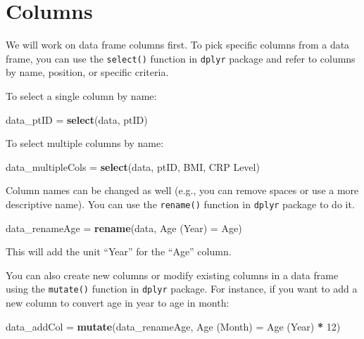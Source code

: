 \documentclass[
]{article}
\newenvironment{Shaded}{\begin{snugshade}}{\end{snugshade}}
\newcommand{\AttributeTok}[1]{\textcolor[rgb]{0.13,0.29,0.53}{#1}}
\newcommand{\DecValTok}[1]{\textcolor[rgb]{0.00,0.00,0.81}{#1}}
\newcommand{\FunctionTok}[1]{\textcolor[rgb]{0.13,0.29,0.53}{\textbf{#1}}}
\newcommand{\NormalTok}[1]{#1}
\newcommand{\OtherTok}[1]{\textcolor[rgb]{0.56,0.35,0.01}{#1}}
\newcommand{\SpecialCharTok}[1]{\textcolor[rgb]{0.81,0.36,0.00}{\textbf{#1}}}
\newcommand{\StringTok}[1]{\textcolor[rgb]{0.31,0.60,0.02}{#1}}
\begin{document}
\section{Columns}\label{columns}

We will work on data frame columns first. To pick specific columns from
a data frame, you can use the \texttt{select()} function in
\texttt{dplyr} package and refer to columns by name, position, or
specific criteria.

To select a single column by name:

\begin{Shaded}
\begin{Highlighting}[]
\NormalTok{data\_ptID }\OtherTok{=} \FunctionTok{select}\NormalTok{(data, ptID)}
\end{Highlighting}
\end{Shaded}

To select multiple columns by name:

\begin{Shaded}
\begin{Highlighting}[]
\NormalTok{data\_multipleCols }\OtherTok{=} \FunctionTok{select}\NormalTok{(data, ptID, BMI, }\StringTok{\textasciigrave{}}\AttributeTok{CRP Level}\StringTok{\textasciigrave{}}\NormalTok{)}
\end{Highlighting}
\end{Shaded}

Column names can be changed as well (e.g., you can remove spaces or use
a more descriptive name). You can use the \texttt{rename()} function in
\texttt{dplyr} package to do it.

\begin{Shaded}
\begin{Highlighting}[]
\NormalTok{data\_renameAge }\OtherTok{=} \FunctionTok{rename}\NormalTok{(data, }\StringTok{\textasciigrave{}}\AttributeTok{Age (Year)}\StringTok{\textasciigrave{}} \OtherTok{=}\NormalTok{ Age)}
\end{Highlighting}
\end{Shaded}

This will add the unit ``Year'' for the ``Age'' column.

You can also create new columns or modify existing columns in a data
frame using the \texttt{mutate()} function in \texttt{dplyr} package.
For instance, if you want to add a new column to convert age in year to
age in month:

\begin{Shaded}
\begin{Highlighting}[]
\NormalTok{data\_addCol }\OtherTok{=} \FunctionTok{mutate}\NormalTok{(data\_renameAge, }\StringTok{\textasciigrave{}}\AttributeTok{Age (Month)}\StringTok{\textasciigrave{}} \OtherTok{=} \StringTok{\textasciigrave{}}\AttributeTok{Age (Year)}\StringTok{\textasciigrave{}} \SpecialCharTok{*} \DecValTok{12}\NormalTok{)}
\end{Highlighting}
\end{Shaded}
\end{document}
